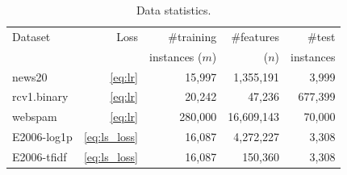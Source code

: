\documentclass{article}
\theoremstyle{plain}
\theoremstyle{definition}
\theoremstyle{remark}
\newcommand*{\lmss}{\fontfamily{lmss}\selectfont}
\def\news{{\lmss news20}\xspace}
\def\webspam{{\lmss webspam}\xspace}
\def\rcv{{\lmss rcv1.binary}\xspace}
\def\gisette{{\lmss gisette\_scale}\xspace}
\def\duke{{\lmss duke}\xspace}
\def\leu{{\lmss leukemia}\xspace}
\def\colon{{\lmss colon-cancer}\xspace}
\def\El{{\lmss E2006-log1p}\xspace}
\def\Et{{\lmss E2006-tfidf}\xspace}
\begin{document}
	\begin{table}
		\caption{Data statistics.}
		\label{tbl:data}
		\centering
		\setlength{\tabcolsep}{2pt}
		\begin{tabular}{@{}lrrrr@{}}
			\toprule
			Dataset & Loss & \#training & \#features  & \#test
			\\
			& & instances ($m$) & ($n$) & instances
			\\
			\midrule
			\news & \cref{eq:lr} & 15,997 & 1,355,191 & 3,999\\
			\rcv & \cref{eq:lr} & 20,242 & 47,236 & 677,399\\
			\webspam & \cref{eq:lr} & 280,000 & 16,609,143 & 70,000\\
			\midrule
			\El & \cref{eq:ls_loss} & 16,087 & 4,272,227 & 3,308\\
			\Et & \cref{eq:ls_loss} & 16,087 & 150,360 & 3,308\\
			\bottomrule
		\end{tabular}
	\end{table}
\end{document}
